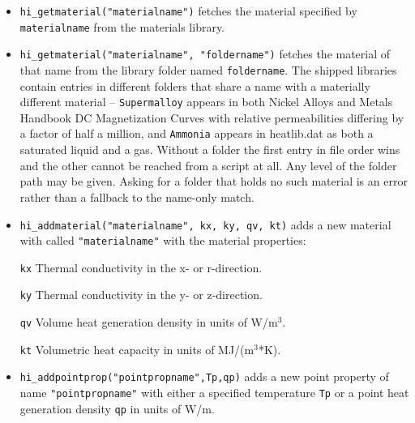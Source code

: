 \begin{itemize}
\item \texttt{hi\_getmaterial("materialname")} fetches the material specified by \texttt{materialname}
from the materials library.

\item \texttt{hi\_getmaterial("materialname", "foldername")} fetches the
material of that name from the library folder named \texttt{foldername}.
The shipped libraries contain entries in different folders that share a
name with a materially different material -- \texttt{Supermalloy} appears
in both Nickel Alloys and Metals Handbook DC Magnetization Curves with
relative permeabilities differing by a factor of half a million, and
\texttt{Ammonia} appears in heatlib.dat as both a saturated liquid and a
gas. Without a folder the first entry in file order wins and the other
cannot be reached from a script at all. Any level of the folder path may
be given. Asking for a folder that holds no such material is an error
rather than a fallback to the name-only match.

\item \texttt{hi\_addmaterial("materialname", kx, ky, qv, kt)} adds a new material with
called \texttt{"materialname"} with the material properties:

\texttt{kx} Thermal conductivity in the x- or r-direction.

\texttt{ky} Thermal conductivity in the y- or z-direction.

\texttt{qv} Volume heat generation density in units of W/m$^{3}$.

\texttt{kt} Volumetric heat capacity in units of MJ/(m$^{3}$*K).

\item \texttt{hi\_addpointprop("pointpropname",Tp,qp)} adds a new point property of
name \texttt{"pointpropname"} with either a specified temperature
\texttt{Tp} or a point heat generation density \texttt{qp} in units of W/m.


\end{itemize}
